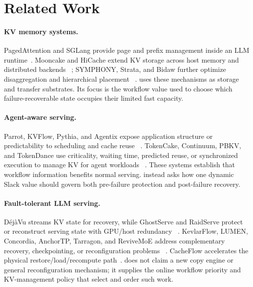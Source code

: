 \section{Related Work}
\label{sec:related-work}

\paragraph{KV memory systems.}
PagedAttention and SGLang provide page and prefix management inside an LLM
runtime~\cite{kwon2023vllm,zheng2024sglang}.  Mooncake and HiCache extend KV
storage across host memory and distributed backends
~\cite{qin2025mooncake,xie2025hicache}; SYMPHONY, Strata, and Bidaw further
optimize disaggregation and hierarchical placement
~\cite{agarwal2026symphony,xie2026strata,hu2026bidaw}.  \system{} uses these
mechanisms as storage and transfer substrates.  Its focus is the workflow value
used to choose which failure-recoverable state occupies their limited fast
capacity.

\paragraph{Agent-aware serving.}
Parrot, KVFlow, Pythia, and Agentix expose application structure or
predictability to scheduling and cache reuse
~\cite{lin2024parrot,pan2025kvflow,yu2026pythia,luo2026agentix}.  TokenCake,
Continuum, PBKV, and TokenDance use criticality, waiting time, predicted reuse,
or synchronized execution to manage KV for agent workloads
~\cite{bian2026tokencake,li2026continuum,zheng2026pbkv,bian2026tokendance}.
These systems establish that workflow information benefits normal serving.
\system{} instead asks how one dynamic Slack value should govern both
pre-failure protection and post-failure recovery.

\paragraph{Fault-tolerant LLM serving.}
D\'ej\`aVu streams KV state for recovery, while GhostServe and RaidServe protect
or reconstruct serving state with GPU/host redundancy
~\cite{strati2024dejavu,jayakody2026ghostserve,xu2026raidserve}.  KevlarFlow,
LUMEN, Concordia, AnchorTP, Tarragon, and ReviveMoE address complementary
recovery, checkpointing, or reconfiguration problems
~\cite{qian2026kevlarflow,cao2026lumen,gan2026concordia,xu2026anchortp,
zhang2026tarragon,li2026revivemoe}.  CacheFlow accelerates the physical
restore/load/recompute path~\cite{nian2026cacheflow}.  \system{} does not claim
a new copy engine or general reconfiguration mechanism; it supplies the online
workflow priority and KV-management policy that select and order such work.

